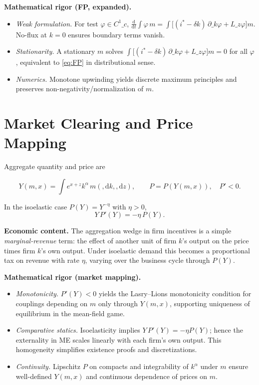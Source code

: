 \documentclass[11pt,letterpaper,oneside]{article}
\numberwithin{equation}{section}
\newcommand{\1}{\mathbf{1}}
\newcommand{\diff}{,\mathrm{d}}
\newcommand{\Lz}{L\_z}
\begin{document}
\begin{tcolorbox}[mathstyle]
\textbf{Mathematical rigor (FP, expanded).}
\begin{itemize}[leftmargin=1.15em,itemsep=0.25em]
  \item \emph{Weak formulation.} For test $\varphi\in C^1\_c$, $\frac{\mathrm d}{\mathrm dt}\int \varphi\,m=\int \big[(i^*-\delta k)\,\partial\_k\varphi + \Lz\varphi\big] m$. No-flux at $k=0$ ensures boundary terms vanish.
  \item \emph{Stationarity.} A stationary $m$ solves $\int \big[(i^*-\delta k)\,\partial\_k\varphi + \Lz\varphi\big] m=0$ for all $\varphi$, equivalent to \eqref{eq:FP} in distributional sense.
  \item \emph{Numerics.} Monotone upwinding yields discrete maximum principles and preserves non-negativity/normalization of $m$.
\end{itemize}
\end{tcolorbox}

\section{Market Clearing and Price Mapping}
Aggregate quantity and price are

$$
Y(m,x)=\int e^{x+z}k^\alpha\,m(\diff k,\diff z),\qquad P=P(Y(m,x)),\quad P'<0.
$$

In the isoelastic case $P(Y)=Y^{-\eta}$ with $\eta>0$,
\begin{equation}\label{eq:isoelastic}
Y\,P'(Y) = -\eta\, P(Y).
\end{equation}

\begin{tcolorbox}[didacticstyle]
\textbf{Economic content.} The aggregation wedge in firm incentives is a simple \emph{marginal-revenue} term: the effect of another unit of firm $k$'s output on the price times firm $k$'s own output. Under isoelastic demand this becomes a proportional tax on revenue with rate $\eta$, varying over the business cycle through $P(Y)$.
\end{tcolorbox}

\begin{tcolorbox}[mathstyle]
\textbf{Mathematical rigor (market mapping).}
\begin{itemize}[leftmargin=1.15em,itemsep=0.25em]
  \item \emph{Monotonicity.} $P'(Y)<0$ yields the Lasry--Lions monotonicity condition for couplings depending on $m$ only through $Y(m,x)$, supporting uniqueness of equilibrium in the mean-field game.
  \item \emph{Comparative statics.} Isoelasticity implies $Y\,P'(Y)=-\eta P(Y)$; hence the externality in ME scales linearly with each firm's own output. This homogeneity simplifies existence proofs and discretizations.
  \item \emph{Continuity.} Lipschitz $P$ on compacts and integrability of $k^\alpha$ under $m$ ensure well-defined $Y(m,x)$ and continuous dependence of prices on $m$.
\end{itemize}
\end{tcolorbox}
\end{document}
